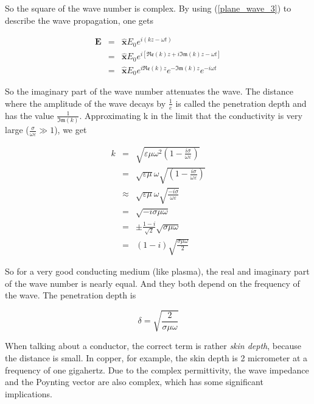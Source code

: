 \documentclass[a4paper,14pt]{extbook}
\begin{document}
So the square of the wave number is complex. By using (\ref{plane_wave_3}) to describe the wave propagation, one gets

\begin{eqnarray}\label{plane_wave_conductor}
    \mathbf{E}&=& \mathbf{\hat{x}}E_0 e^{i(kz-\omega t)} \nonumber\\
&=& \mathbf{\hat{x}}E_0 e^{i\left[ \mathfrak{Re}(k)z+i\mathfrak{Im}(k)z-\omega t\right] } \nonumber \\
&=& \mathbf{\hat{x}}E_0 e^{i\mathfrak{Re}(k)z}e^{-\mathfrak{Im}(k)z}e^{-i\omega t}
\end{eqnarray}

So the imaginary part of the wave number attenuates the wave. The distance where the amplitude of the wave decays by $\frac{1}{e}$ is called the penetration depth and has the value $\frac{1}{\mathfrak{Im}(k)}$. Approximating k in the limit that the conductivity is very large ($\frac{ \sigma}{ \omega \varepsilon} \gg 1$), we get

\begin{eqnarray}
  k &=& \sqrt{\varepsilon \mu  \omega^2 \left( 1- \frac{ i\sigma}{ \omega \varepsilon}\right) } \nonumber\\
&=& \sqrt{\varepsilon \mu}  \omega \sqrt{\left( 1- \frac{ i\sigma}{ \omega \varepsilon}\right) } \nonumber \\
&\approx& \sqrt{\varepsilon \mu}  \omega \sqrt{ \frac{ -i\sigma}{ \omega \varepsilon} } \nonumber \\
&=&  \sqrt{  -i\sigma \mu \omega } \nonumber \\
&=& \pm \frac{1-i}{\sqrt{2}} \sqrt{ \sigma \mu \omega } \nonumber \\
&=& (1-i) \sqrt{\frac{ \sigma \mu \omega }{2}}
\end{eqnarray}

So for a very good conducting medium (like plasma), the real and imaginary part of the wave number is nearly equal. And they both depend on the frequency of the wave. The penetration depth is

\begin{equation}\label{skin depth_conductor}
    \delta=\sqrt{\frac{2}{ \sigma \mu \omega }}
\end{equation}

When talking about a conductor, the correct term is rather \emph{skin depth}, because the distance is small. In copper, for example, the skin depth is 2 micrometer at a frequency of one gigahertz. Due to the complex permittivity, the wave impedance and the Poynting vector are also complex, which has some significant implications.
\end{document}
